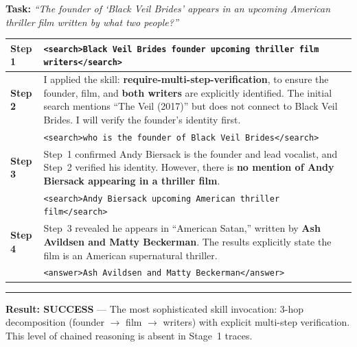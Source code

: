 \documentclass{article}
\theoremstyle{plain}
\theoremstyle{definition}
\theoremstyle{remark}
\begin{document}
\begin{tcolorbox}[
    colback=white, colframe=stage3color, width=\textwidth, sharp corners,
    boxrule=0.8pt, left=5pt, right=5pt, top=5pt, bottom=5pt,
    title=\textbf{Case 4 (Stage 3, Step 287): Multi-hop Decomposition --- require-multi-step-verification},
    fonttitle=\sffamily\small, colbacktitle=stage3color!10, coltitle=black
]
\small

\textbf{Task:} \textit{``The founder of `Black Veil Brides' appears in an upcoming American thriller film written by what two people?''}

\vspace{4pt}
\begin{tabularx}{\linewidth}{@{}p{1.0cm} X@{}}
    \textbf{Step 1} & \texttt{<search>Black Veil Brides founder upcoming thriller film writers</search>} \\
    \midrule
    \textbf{Step 2} & I applied the skill: \textbf{\textcolor{skillcolor}{require-multi-step-verification}}, to ensure the founder, film, and \textbf{both writers} are explicitly identified. The initial search mentions ``The Veil (2017)'' but does not connect to Black Veil Brides. I will verify the founder's identity first. \\
    & \texttt{<search>who is the founder of Black Veil Brides</search>} \\
    \midrule
    \textbf{Step 3} & Step~1 confirmed Andy Biersack is the founder and lead vocalist, and Step~2 verified his identity. However, there is \textbf{no mention of Andy Biersack appearing in a thriller film}. \\
    & \texttt{<search>Andy Biersack upcoming American thriller film</search>} \\
    \midrule
    \textbf{Step 4} & Step~3 revealed he appears in ``American Satan,'' written by \textbf{Ash Avildsen and Matty Beckerman}. The results explicitly state the film is an American supernatural thriller. \\
    & \texttt{<answer>Ash Avildsen and Matty Beckerman</answer>} \\
\end{tabularx}

\vspace{3pt}\hrule\vspace{3pt}
\textbf{\textcolor{successgreen}{Result: SUCCESS}} --- The most sophisticated skill invocation: 3-hop decomposition (founder $\to$ film $\to$ writers) with explicit multi-step verification. This level of chained reasoning is absent in Stage~1 traces.
\end{tcolorbox}
\end{document}
